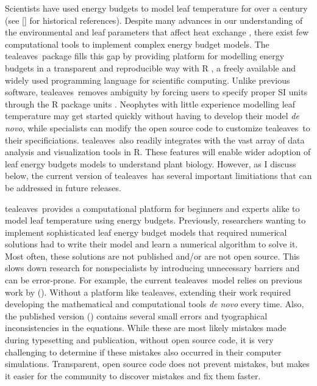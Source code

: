 \documentclass[11pt, oneside]{article}
\newcommand{\pkg}[1]{{\fontseries{b}\selectfont #1}}
\newcommand{\tealeaves}{\pkg{tealeaves}}
\begin{document}
Scientists have used energy budgets to model leaf temperature for over a century (see \citeauthor{Raschke_1960} [\citeyear{Raschke_1960}] for historical references). Despite many advances in our understanding of the environmental and leaf parameters that affect heat exchange \citep{Gutschick_2016}, there exist few computational tools to implement complex energy budget models. The \tealeaves~package fills this gap by providing platform for modelling energy budgets in a transparent and reproducible way with R \citep{R_2018}, a freely available and widely used programming language for scientific computing. Unlike previous software, \tealeaves~removes ambiguity by forcing users to specify proper SI units through the R package \pkg{units} \citep{Pebesma_etal_2016}. Neophytes with little experience modelling leaf temperature may get started quickly without having to develop their model \textit{de novo}, while specialists can modify the open source code to customize \tealeaves~to their specificiations. \tealeaves~also readily integrates with the vast array of data analysis and visualization tools in R. These features will enable wider adoption of leaf energy budgets models to understand plant biology. However, as I discuss below, the current version of \tealeaves~has several important limitiations that can be addressed in future releases.

\tealeaves~provides a computational platform for beginners and experts alike to model leaf temperature using energy budgets. Previously, researchers wanting to implement sophisticated leaf energy budget models that required numerical solutions had to write their model and learn a numerical algorithm to solve it. Most often, these solutions are not published and/or are not open source. This slows down research for nonspecialists by introducing unnecessary barriers and can be error-prone. For example, the current \tealeaves~model relies on previous work by \citeauthor{Foster_Smith_1986} (\citeyear{Foster_Smith_1986}). Without a platform like \tealeaves, extending their work required developing the mathematical and computational tools \textit{de novo} every time. Also, the published version \citeauthor{Foster_Smith_1986} (\citeyear{Foster_Smith_1986}) contains several small errors and tyographical inconsistencies in the equations. While these are most likely mistakes made during typesetting and publication, without open source code, it is very challenging to determine if these mistakes also occurred in their computer simulations. Transparent, open source code does not prevent mistakes, but makes it easier for the community to discover mistakes and fix them faster. 
\end{document}
